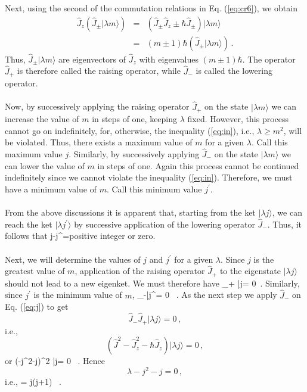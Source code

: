 Next, using the second of the commutation relations in Eq. (\ref{eq:cr6}), we obtain
\begin{eqnarray}
\hat{J}_z\left( \hat{J}_{\pm}|\lambda m\rangle \right) & = & (\hat{J}_{\pm}\hat{J}_z \pm \hbar \hat{J}_{\pm})|\lambda m\rangle
\nonumber \\
&= & (m\pm1)\hbar \left(\hat{J}_{\pm}|\lambda m\rangle \right)\, .
\end{eqnarray}
Thus, $\hat{J}_{\pm}|\lambda m\rangle$ are eigenvectors of $\hat{J}_z$ with eigenvalues $(m\pm 1)\hbar$. The operator 
$\hat{J}_{+}$ is therefore called the raising operator, while $\hat{J}_{-}$ is called the lowering operator.

\paragraph{}	
Now, by successively applying the raising operator $\hat{J}_{+}$ on the state $|\lambda m\rangle$ we can increase the
value of $m$ in steps of one, keeping $\lambda$ fixed. However, this process cannot go on indefinitely, for, otherwise, the inequality (\ref{eq:in}), 
i.e., $\lambda \geq m^2$, will be violated. Thus, there exists a maximum value of $m$ for a given $\lambda$. Call this maximum value $j$. Similarly, 
by successively applying $\hat{J}_{-}$ on the state $|\lambda m\rangle$ we can lower the value of $m$ in steps of one. Again this process cannot be continued indefinitely since we cannot violate the inequality (\ref{eq:in}). Therefore, we must have a minimum value of $m$. Call this minimum
value $j^{\prime}$.

\paragraph{}
From the above discussions it is apparent that, starting from the ket $|\lambda j\rangle$, we can reach the ket $|\lambda j^{\prime}\rangle$ by successive application of the lowering operator $\hat{J}_{-}$. Thus, it follows that
\be
j-j^{\prime}={\rm positive\; integer\; or\; zero}.
\label{eq:positiveinteger}
\ee

\paragraph{}
Next, we will determine the values of $j$ and $j^{\prime}$ for a given $\lambda$. Since $j$ is the greatest value of $m$, application of the raising operator $\hat{J}_{+}$ to the eigenstate $|\lambda j\rangle$ should not lead to
a new eigenket. We must therefore have
\be
{}_{+} |\lambda j\rangle = 0\, .
\label{eq:j}
\ee
Similarly, since $j^{\prime}$ is the minimum value of $m$,
\be 
{}_{-}|\lambda j^{\prime}\rangle = 0 \, .
\label{eq:jp}
\ee
As the next step we apply $\hat{J}_{-}$ on Eq. (\ref{eq:j}) to get
\[ \hat{J}_{-}\hat{J}_{+} |\lambda j\rangle = 0 \, , \]
i.e.,
\[ \left( \hat{J}^2-\hat{J}_z^2 - \hbar\hat{J}_z\right)|\lambda j\rangle = 0 \, , \]
or
\be
(\lambda-j^2-j)\hbar^2 |\lambda j\rangle = 0 \, .
\ee
Hence
\[ \lambda - j^2-j =0\, , \]
i.e.,
\be
\lambda = j(j+1) \, .
\label{eq:lambda1}
\ee


